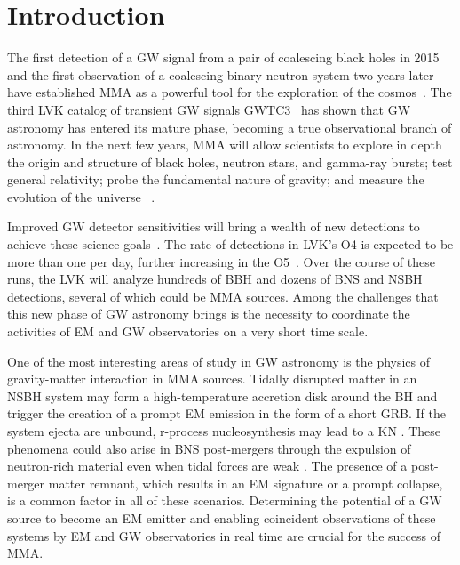 \section{Introduction\label{intro}}

The first detection of a \ac{GW} signal from a pair of coalescing black holes in 2015 and the first observation of a coalescing binary neutron system two years later
have established \ac{MMA} as a powerful tool for the exploration of the cosmos~\cite{LIGOScientific:2016aoc,LIGOScientific:2017vwq}. The third \ac{LVK} catalog of transient \ac{GW} signals \ac{GWTC3}~\cite{LIGOScientific:2021djp}
has shown that \ac{GW} astronomy has entered its mature phase, becoming a true observational branch of astronomy. In the next few years, \ac{MMA} will allow scientists
to explore in depth the origin and structure of black holes, neutron stars, and gamma-ray bursts; test general relativity; probe the fundamental nature of gravity; and
measure the evolution of the universe~\cite{LIGOScientific:2021sio,LIGOScientific:2021psn,LIGOScientific:2021aug} . 

Improved \ac{GW} detector sensitivities will bring a wealth of new detections to achieve these science goals~\cite{LIGOScientific:2014pky,VIRGO:2014yos}. The rate
of detections in \ac{LVK}'s \ac{O4} is expected to be more than one per day, further increasing in the \ac{O5}~\cite{KAGRA:2013rdx}. Over the course of
these runs, the \ac{LVK} will analyze hundreds of \ac{BBH} and dozens of \ac{BNS} and \ac{NSBH} detections, several of which could be \ac{MMA} sources. Among the
challenges that this new phase of \ac{GW} astronomy brings is the necessity to coordinate the activities of \ac{EM} and \ac{GW} observatories on a very short time
scale. 

One of the most interesting areas of study in \ac{GW} astronomy is the physics of gravity-matter interaction in \ac{MMA} sources. Tidally disrupted matter in an
\ac{NSBH} system may form a high-temperature accretion disk around the \ac{BH} and trigger the creation of a prompt \ac{EM} emission in the form of a short \ac{GRB}. If
the system ejecta are unbound, r-process nucleosynthesis may lead to a \ac{KN} \cite{Lattimer:1974slx, Li:1998bw, Korobkin:2012uy, Barnes:2013wka, Tanaka:2013ana,
Kasen:2014toa}. These phenomena could also arise in \ac{BNS} post-mergers through the expulsion of neutron-rich material even when tidal forces are weak
\cite{LIGOScientific:2017ync, Arcavi:2017xiz, Coulter:2017wya, Kasliwal:2017ngb, Lipunov:2017dwd, DES:2017kbs, Tanvir:2017pws}. The presence of a post-merger matter
remnant, which results in an \ac{EM} signature or a prompt collapse, is a common factor in all of these scenarios. Determining the potential of a \ac{GW} source to
become an \ac{EM} emitter and enabling coincident observations of these systems by \ac{EM} and \ac{GW} observatories in real time are crucial for the success of
\ac{MMA}.

